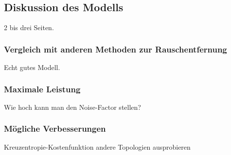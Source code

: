 \subsection{Diskussion des Modells}
2 bis drei Seiten.

\subsubsection{Vergleich mit anderen Methoden zur Rauschentfernung}

Echt gutes Modell.
\subsubsection{Maximale Leistung}
Wie hoch kann man den Noise-Factor stellen?

\subsubsection{Mögliche Verbesserungen}
Kreuzentropie-Kostenfunktion
andere Topologien ausprobieren


